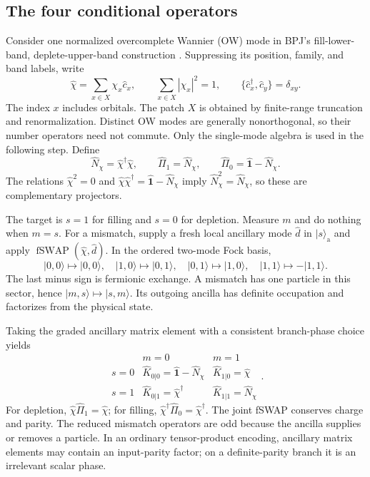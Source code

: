 \documentclass[aps,prb,onecolumn,nofootinbib,superscriptaddress]{revtex4-2}
\newcommand{\One}{\hat{\mathbf{1}}}
\newcommand{\fSWAP}{\operatorname{fSWAP}}
\newcommand{\ket}[1]{\lvert #1\rangle}
\begin{document}
\subsection{The four conditional operators}
Consider one normalized overcomplete Wannier (OW) mode in BPJ's
fill-lower-band, deplete-upper-band construction \cite{BhuiyanPanJian2026}.
Suppressing its position, family, and band labels, write
\begin{equation}
 \hat\chi=\sum_{x\in X}\chi_x\hat c_x,\qquad
 \sum_{x\in X}|\chi_x|^2=1,\qquad
 \{\hat c_x^\dagger,\hat c_y\}=\delta_{xy}.
 \label{eq:ow}
\end{equation}
The index $x$ includes orbitals. The patch $X$ is obtained by finite-range
truncation and renormalization. Distinct OW modes are generally
nonorthogonal, so their number operators need not commute. Only the
single-mode algebra is used in the following step. Define
\begin{equation}
 \hat N_\chi=\hat\chi^\dagger\hat\chi,\qquad
 \hat\Pi_1=\hat N_\chi,\qquad
 \hat\Pi_0=\One-\hat N_\chi.
 \label{eq:projectors}
\end{equation}
The relations $\hat\chi^2=0$ and
$\hat\chi\hat\chi^\dagger=\One-\hat N_\chi$ imply
$\hat N_\chi^2=\hat N_\chi$, so these are complementary projectors.

The target is $s=1$ for filling and $s=0$ for depletion. Measure $m$ and
do nothing when $m=s$. For a mismatch, supply a fresh local ancillary mode
$\hat d$ in $\ket{s}_{\mathrm a}$ and apply
$\fSWAP(\hat\chi,\hat d)$. In the ordered two-mode Fock basis,
\begin{equation}
 \ket{0,0}\mapsto\ket{0,0},\quad
 \ket{1,0}\mapsto\ket{0,1},\quad
 \ket{0,1}\mapsto\ket{1,0},\quad
 \ket{1,1}\mapsto-\ket{1,1}.
 \label{eq:fswap}
\end{equation}
The last minus sign is fermionic exchange. A mismatch has one particle
in this sector, hence $\ket{m,s}\mapsto\ket{s,m}$. Its outgoing
ancilla has definite occupation and factorizes from the physical state.

Taking the graded ancillary matrix element with a consistent branch-phase
choice yields
\begin{equation}
 \begin{array}{c|cc}
 &m=0&m=1\\ \hline
 s=0&\hat K_{0|0}=\One-\hat N_\chi&\hat K_{1|0}=\hat\chi\\[1mm]
 s=1&\hat K_{0|1}=\hat\chi^\dagger&\hat K_{1|1}=\hat N_\chi
 \end{array}.
 \label{eq:kraus-table}
\end{equation}
For depletion, $\hat\chi\hat\Pi_1=\hat\chi$; for filling,
$\hat\chi^\dagger\hat\Pi_0=\hat\chi^\dagger$. The joint fSWAP conserves
charge and parity. The reduced mismatch operators are odd because the
ancilla supplies or removes a particle. In an ordinary tensor-product
encoding, ancillary matrix elements may contain an input-parity factor;
on a definite-parity branch it is an irrelevant scalar phase.
\end{document}
